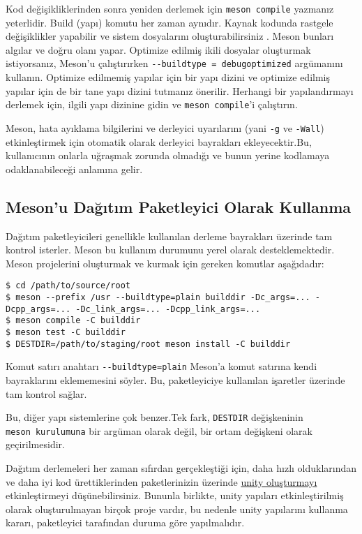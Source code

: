 \documentclass[
]{book}
\begin{document}
Kod değişikliklerinden sonra yeniden derlemek için \texttt{meson\ compile} yazmanız yeterlidir. Build (yapı) komutu her zaman aynıdır. Kaynak kodunda rastgele değişiklikler yapabilir ve sistem dosyalarını oluşturabilirsiniz . Meson bunları algılar ve doğru olanı yapar. Optimize edilmiş ikili dosyalar oluşturmak istiyorsanız, Meson'u çalıştırırken \texttt{-\/-buildtype\ =\ debugoptimized} argümanını kullanın. Optimize edilmemiş yapılar için bir yapı dizini ve optimize edilmiş yapılar için de bir tane yapı dizini tutmanız önerilir. Herhangi bir yapılandırmayı derlemek için, ilgili yapı dizinine gidin ve \texttt{meson\ compile}'i çalıştırın.

Meson, hata ayıklama bilgilerini ve derleyici uyarılarını (yani \texttt{-g} ve \texttt{-Wall}) etkinleştirmek için otomatik olarak derleyici bayrakları ekleyecektir.Bu, kullanıcının onlarla uğraşmak zorunda olmadığı ve bunun yerine kodlamaya odaklanabileceği anlamına gelir.

\hypertarget{mesonu-daux11fux131tux131m-paketleyici-olarak-kullanma}{%
\subsection{Meson'u Dağıtım Paketleyici Olarak Kullanma}\label{mesonu-daux11fux131tux131m-paketleyici-olarak-kullanma}}

Dağıtım paketleyicileri genellikle kullanılan derleme bayrakları üzerinde tam kontrol isterler. Meson bu kullanım durumunu yerel olarak desteklemektedir. Meson projelerini oluşturmak ve kurmak için gereken komutlar aşağıdadır:

\begin{verbatim}
$ cd /path/to/source/root
$ meson --prefix /usr --buildtype=plain builddir -Dc_args=... -Dcpp_args=... -Dc_link_args=... -Dcpp_link_args=...
$ meson compile -C builddir
$ meson test -C builddir
$ DESTDIR=/path/to/staging/root meson install -C builddir
\end{verbatim}

Komut satırı anahtarı \texttt{-\/-buildtype=plain} Meson'a komut satırına kendi bayraklarını eklememesini söyler. Bu, paketleyiciye kullanılan işaretler üzerinde tam kontrol sağlar.

Bu, diğer yapı sistemlerine çok benzer.Tek fark, \texttt{DESTDIR} değişkeninin \texttt{meson\ kurulumuna} bir argüman olarak değil, bir ortam değişkeni olarak geçirilmesidir.

Dağıtım derlemeleri her zaman sıfırdan gerçekleştiği için, daha hızlı olduklarından ve daha iyi kod ürettiklerinden paketlerinizin üzerinde \href{https://mesonbuild.com/Unity-builds.html}{unity oluşturmayı} etkinleştirmeyi düşünebilirsiniz. Bununla birlikte, unity yapıları etkinleştirilmiş olarak oluşturulmayan birçok proje vardır, bu nedenle unity yapılarını kullanma kararı, paketleyici tarafından duruma göre yapılmalıdır.
\end{document}
